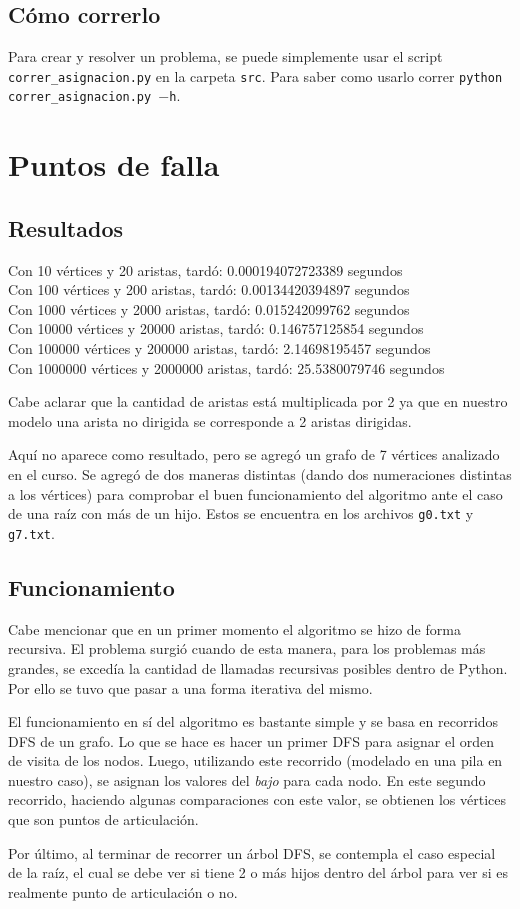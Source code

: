 \documentclass[a4paper,10pt]{article}
\begin{document}
\subsection{Cómo correrlo}
	Para crear y resolver un problema, se puede simplemente usar el script \texttt{correr\_asignacion.py} en la carpeta \texttt{src}. Para saber como usarlo correr \texttt{python correr\_asignacion.py $-$h}.

\section{Puntos de falla}
\subsection{Resultados}
	\noindent Con 10 vértices y 20 aristas, tardó: 0.000194072723389 segundos \\
	Con 100 vértices y 200 aristas, tardó: 0.00134420394897 segundos \\
	Con 1000 vértices y 2000 aristas, tardó: 0.015242099762 segundos \\
	Con 10000 vértices y 20000 aristas, tardó: 0.146757125854 segundos \\
	Con 100000 vértices y 200000 aristas, tardó: 2.14698195457 segundos \\
	Con 1000000 vértices y 2000000 aristas, tardó: 25.5380079746 segundos \\
	\par Cabe aclarar que la cantidad de aristas está multiplicada por 2 ya que en nuestro modelo una arista no dirigida se corresponde a 2 aristas dirigidas.
	\par Aquí no aparece como resultado, pero se agregó un grafo de 7 vértices analizado en el curso. Se agregó de dos maneras distintas (dando dos numeraciones distintas a los vértices) para comprobar el buen funcionamiento del algoritmo ante el caso de una raíz con más de un hijo. Estos se encuentra en los archivos \texttt{g0.txt} y \texttt{g7.txt}.
\subsection{Funcionamiento}
	Cabe mencionar que en un primer momento el algoritmo se hizo de forma recursiva. El problema surgió cuando de esta manera, para los problemas más grandes, se excedía la cantidad de llamadas recursivas posibles dentro de Python. Por ello se tuvo que pasar a una forma iterativa del mismo.
	\par El funcionamiento en sí del algoritmo es bastante simple y se basa en recorridos DFS de un grafo. Lo que se hace es hacer un primer DFS para asignar el orden de visita de los nodos. Luego, utilizando este recorrido (modelado en una pila en nuestro caso), se asignan los valores del \emph{bajo} para cada nodo. En este segundo recorrido, haciendo algunas comparaciones con este valor, se obtienen los vértices que son puntos de articulación.
	\par Por último, al terminar de recorrer un árbol DFS, se contempla el caso especial de la raíz, el cual se debe ver si tiene 2 o más hijos dentro del árbol para ver si es realmente punto de articulación o no.
\end{document}
